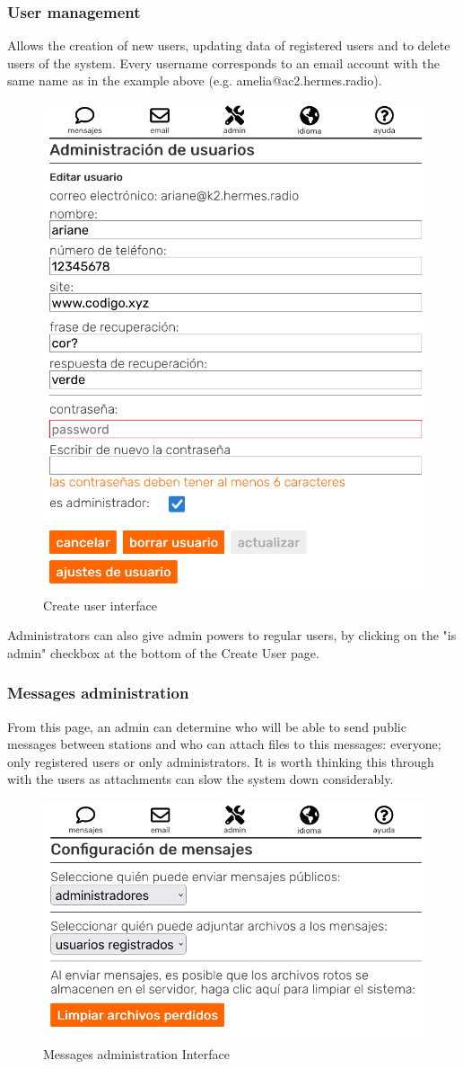 \documentclass[11pt,a4paper]{article}
\begin{document}
\subsubsection{User management} 

Allows the creation of new users, updating data of registered users and to delete users of the system. Every username corresponds to an email account with the same name as in the example above (e.g. amelia@ac2.hermes.radio). 
    
    \begin{figure}[H]
    \centering
    \includegraphics[width=0.5\columnwidth]{screenshots/frontend/es/createuser.png}
    \caption{Create user interface}
    \label{fig:createuser}
    \end{figure}
    
    Administrators can also give admin powers to regular users, by clicking on the "is admin" checkbox at the bottom of the Create User page.

\subsubsection{Messages administration}  
\label{gui_msg_admin}

From this page, an admin can determine who will be able to send public messages between stations and who can attach files to this messages: everyone; only registered users or only administrators. It is worth thinking this through with the users as attachments can slow the system down considerably.
   
    \begin{figure}[H]
    \centering
    \includegraphics[width=0.5\columnwidth]{screenshots/frontend/es/messageadm.png}
    \caption{Messages administration Interface}
    \label{fig:messageadm}
   
    \end{figure}
\end{document}
